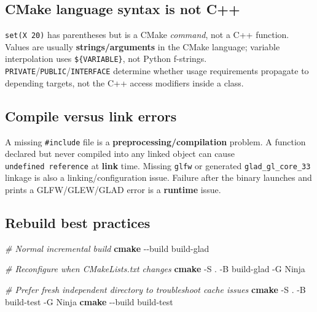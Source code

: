 \documentclass[
  10pt,
  a4paper,
]{article}
\newenvironment{Shaded}{\begin{snugshade}}{\end{snugshade}}
\newcommand{\AttributeTok}[1]{\textcolor[rgb]{0.13,0.29,0.53}{#1}}
\newcommand{\CommentTok}[1]{\textcolor[rgb]{0.56,0.35,0.01}{\textit{#1}}}
\newcommand{\FunctionTok}[1]{\textcolor[rgb]{0.13,0.29,0.53}{\textbf{#1}}}
\newcommand{\NormalTok}[1]{#1}
\begin{document}
\subsection{CMake language syntax is not
C++}\label{cmake-language-syntax-is-not-c}

\texttt{set(X\ 20)} has parentheses but is a CMake \emph{command}, not a
C++ function. Values are usually \textbf{strings/arguments} in the CMake
language; variable interpolation uses \texttt{\$\{VARIABLE\}}, not
Python f-strings. \texttt{PRIVATE}/\texttt{PUBLIC}/\texttt{INTERFACE}
determine whether usage requirements propagate to depending targets, not
the C++ access modifiers inside a class.

\subsection{Compile versus link
errors}\label{compile-versus-link-errors}

A missing \texttt{\#include} file is a
\textbf{preprocessing/compilation} problem. A function declared but
never compiled into any linked object can cause
\texttt{undefined\ reference} at \textbf{link} time. Missing
\texttt{glfw} or generated \texttt{glad\_gl\_core\_33} linkage is also a
linking/configuration issue. Failure after the binary launches and
prints a GLFW/GLEW/GLAD error is a \textbf{runtime} issue.

\subsection{Rebuild best practices}\label{rebuild-best-practices}

\begin{Shaded}
\begin{Highlighting}[]
\CommentTok{\# Normal incremental build}
\FunctionTok{cmake} \AttributeTok{{-}{-}build}\NormalTok{ build{-}glad}

\CommentTok{\# Reconfigure when CMakeLists.txt changes}
\FunctionTok{cmake} \AttributeTok{{-}S}\NormalTok{ . }\AttributeTok{{-}B}\NormalTok{ build{-}glad }\AttributeTok{{-}G}\NormalTok{ Ninja}

\CommentTok{\# Prefer fresh independent directory to troubleshoot cache issues}
\FunctionTok{cmake} \AttributeTok{{-}S}\NormalTok{ . }\AttributeTok{{-}B}\NormalTok{ build{-}test }\AttributeTok{{-}G}\NormalTok{ Ninja}
\FunctionTok{cmake} \AttributeTok{{-}{-}build}\NormalTok{ build{-}test}
\end{Highlighting}
\end{Shaded}
\end{document}

